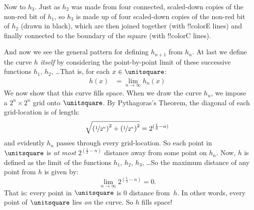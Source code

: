 \documentclass[../../../include/open-logic-section]{subfiles}
\begin{document}
Now to $h_3$. Just as $h_2$ was made from four connected, scaled-down copies of the non-red bit of $h_1$, so $h_3$ is made up of four scaled-down copies of the non-red bit of $h_2$ (drawn in black), which are then joined together (with !!{colorE} lines) and finally connected to the boundary of the square (with !!{colorC} lines).
\begin{center}
\end{center}
And now we see the general pattern for defining $h_{n+1}$ from $h_n$.
At last we define the curve $h$ \emph{itself} by considering the
point-by-point limit of these successive functions $h_1$, $h_2$,
\dots\@ That is, for each $x \in \unitsquare$:
\begin{align*}
	h(x) &= \lim_{n \rightarrow \infty} h_n(x)
\end{align*} 
We now show that this curve fills space. When we draw the curve $h_n$,
we impose a $2^n \times 2^n$ grid onto $\unitsquare$. By Pythagoras's
Theorem, the diagonal of each grid-location is of length:
\[
\sqrt{\left(\nicefrac{1}{2^{n}}\right)^2+\left(\nicefrac{1}{2^{n}}\right)^2} = 2^{(\frac{1}{2}-n)}
\]
and evidently $h_n$ passes through every grid-location. So each point
in $\unitsquare$ is \emph{at most} $2^{(\frac{1}{2}-n)}$ distance away
from some point on $h_n$. Now, $h$ is defined as the limit of the
functions $h_1$, $h_2$, $h_3$, \dots\@ So the maximum distance of any
point from $h$ is given by:
\[
\lim_{n \rightarrow \infty} 2^{(\frac{1}{2}-n)} = 0.
\]
That is: every point in $\unitsquare$ is $0$ distance from~$h$. In
other words, every point of $\unitsquare$ lies \emph{on} the curve. So $h$
fills space!{}
\end{document}
